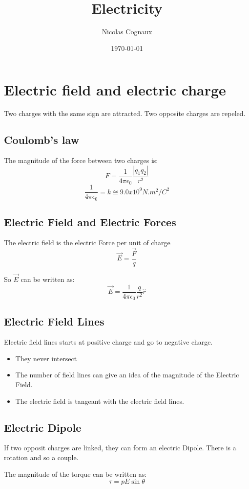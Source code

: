 \documentclass[11pt,a4paper,french]{article}
\title{Electricity}
\author{Nicolas Cognaux}
\date{\today}
\begin{document}
\maketitle

\section{Electric field and electric charge}
Two charges with the same sign are attracted. Two opposite charges are repeled.

\subsection{Coulomb's law}
The magnitude of the force between two charges is:
$$ F = \frac{1}{4\pi\epsilon_0}\frac{|q_1q_2|}{r^2} $$
$$ \frac{1}{4\pi\epsilon_0} = k \cong 9.0x10^9N.m^2/C^2$$


\subsection{Electric Field and Electric Forces}
The electric field is the electric Force per unit of charge
$$ \vec{E} = \frac{\vec{F}}{q} $$

So $\vec{E}$ can be written as:
$$ \vec{E} = \frac{1}{4\pi\epsilon_0}\frac{q}{r^2}\hat{r} $$

\subsection{Electric Field Lines}
Electric field lines starts at positive charge and go to negative charge.

\begin{itemize}
\item They never intersect
\item The number of field lines can give an idea of the magnitude of the Electric Field.
\item The electric field is tangeant with the electric field lines.
\end{itemize}

\subsection{Electric Dipole}
If two opposit charges are linked, they can form an electric Dipole. There is a rotation and so a couple.

The magnitude of the torque can be written as:
$$ \tau = pE\sin{\theta} $$
\end{document}
